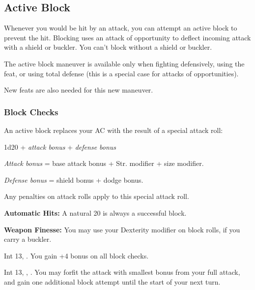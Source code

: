 \subsection{Active Block}
Whenever you would be hit by an attack, you can attempt an active block to prevent the hit. Blocking uses an attack of opportunity to deflect incoming attack with a shield or buckler. You can't block without a shield or buckler.

The active block maneuver is available only when fighting defensively, using the  feat, or using total defense (this is a special case for attacks of opportunities).

New feats are also needed for this new maneuver.

\subsubsection{Block Checks}
An active block replaces your AC with the result of a special attack roll:

\begin{Formula*}{1d20 + \textit{attack bonus} + \textit{defense bonus}}
  \item \textit{Attack bonus} = base attack bonus + Str. modifier + size modifier.
  \item \textit{Defense bonus} = shield bonus + dodge bonus.
\end{Formula*}

Any penalties on attack rolls apply to this special attack roll.

\textbf{Automatic Hits:} A natural 20 is always a successful block.

\textbf{Weapon Finesse:} You may use your Dexterity modifier on block rolls, if you carry a buckler.

{Int 13, .}
{You gain +4 bonus on all block checks.}

{Int 13, , .}
{You may forfit the attack with smallest bonus from your full attack, and gain one additional block attempt until the start of your next turn.}
